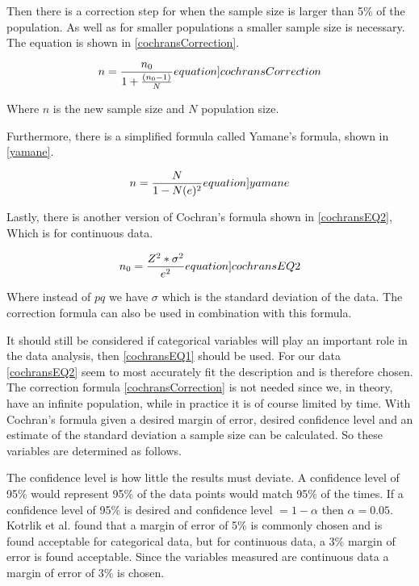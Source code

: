 Then there is a correction step for when the sample size is larger than 5\% of the population. As well as for smaller populations a smaller sample size is necessary.\cite{israel1992determining,kotrlik2001organizational} The equation is shown in \cref{cochransCorrection}.

\begin{equation}
    n = \frac{n_0}{1+\frac{(n_0-1)}{N}}
    \label[equation]{cochransCorrection}
\end{equation}

Where $n$ is the new sample size and $N$ population size.



Furthermore, there is a simplified formula called Yamane's formula, shown in \cref{yamane}\cite{israel1992determining}. 

\begin{equation}
    n = \frac{N}{1 - N(e)^2}
    \label[equation]{yamane}
\end{equation}


Lastly, there is another version of Cochran's formula shown in \cref{cochransEQ2}, Which is for continuous data. 

\begin{equation}
    n_0 = \frac{Z^2*\sigma^2}{e^2}
    \label[equation]{cochransEQ2}
\end{equation}

Where instead of $pq$ we have $\sigma$ which is the standard deviation of the data. The correction formula can also be used in combination with this formula.\nytafsnit



It should still be considered if categorical variables will play an important role in the data analysis, then \cref{cochransEQ1} should be used\cite{kotrlik2001organizational}. For our data \cref{cochransEQ2} seem to most accurately fit the description and is therefore chosen. The correction formula \cref{cochransCorrection} is not needed since we, in theory, have an infinite population, while in practice it is of course limited by time. With Cochran's formula given a desired margin of error, desired confidence level and an estimate of the standard deviation a sample size can be calculated. So these variables are determined as follows. 

The confidence level is how little the results must deviate. A confidence level of 95\% would represent 95\% of the data points would match 95\% of the times. If a confidence level of 95\% is desired and confidence level $= 1 - \alpha$ then $\alpha = 0.05$. Kotrlik et al.\cite{kotrlik2001organizational} found that a margin of error of 5\% is commonly chosen and is found acceptable for categorical data, but for continuous data, a 3\% margin of error is found acceptable\cite{kotrlik2001organizational}. Since the variables measured are continuous data a margin of error of 3\% is chosen.

